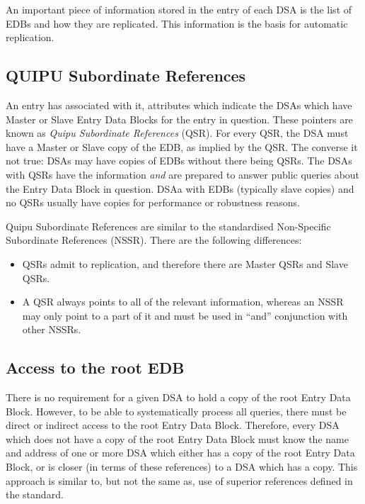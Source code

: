 An important piece of information stored in the entry of each DSA is the
list of EDBs and how they are replicated.  This information is the basis for
automatic replication.   

\subsection {QUIPU Subordinate References}

An entry has associated with it, attributes which indicate  the
DSAs which have Master or Slave Entry Data Blocks for the entry
in question.
These pointers are known as {\em Quipu Subordinate References} (QSR).
For every QSR, the DSA must have a Master or Slave copy of the EDB, as
implied  by the QSR.
The converse it not true:  DSAs may have copies of EDBs without there being
QSRs.
The  DSAs with QSRs have the information {\em and} are
prepared to answer public queries about the Entry Data Block in
question.
DSAa with EDBs (typically slave copies) and no QSRs usually have copies for
performance or robustness reasons.  

Quipu Subordinate References are similar to the standardised Non-Specific
Subordinate References (NSSR).  There are the following differences:

\begin {itemize}
\item QSRs admit to replication, and therefore there are Master QSRs and
Slave QSRs.

\item A QSR always points to all of the relevant information, whereas an NSSR
may only point to a part of it and must be used in ``and'' conjunction with
other NSSRs.
\end {itemize}


\subsection {Access to the root EDB}

There is no requirement for a given DSA to hold a copy of the
root Entry Data Block.
However, to be able to systematically process all queries, there
must be direct or indirect access to the root Entry Data Block.
Therefore, every DSA which does not have a copy of the root
Entry Data Block must know the name and address of one or more
DSA which either has a copy of the root Entry Data Block, or is
closer (in terms of these references) to a DSA which has a
copy.  This approach is similar to, but not the same as, use of superior
references defined in the standard.

